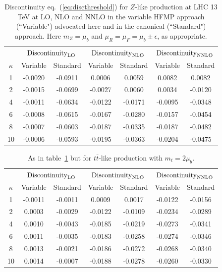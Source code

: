 \documentclass[letter,11pt]{article}
\def\t{{\bar t}}
\def\mub{\mu_b}
\def\k{\kappa}
\begin{document}
%
%
\begin{table}[t]
\centering
\begin{tabular}{c| c c | c c | c c}
& \multicolumn{2}{c}{${\rm Discontinuity}_{\rm LO}$} & \multicolumn{2}{c}{${\rm Discontinuity}_{\rm NLO}$} & \multicolumn{2}{c}{${\rm Discontinuity}_{\rm NNLO}$} \\
$\k$ & Variable & Standard  & Variable & Standard & Variable & Standard \\
\hline
1  & -0.0020 & -0.0911 &  0.0006 &  0.0059 &  0.0082 &  0.0082 \\
2  & -0.0015 & -0.0699 & -0.0027 &  0.0060 &  0.0034 & -0.0120 \\
4  & -0.0011 & -0.0634 & -0.0122 & -0.0171 & -0.0095 & -0.0348 \\
6  & -0.0008 & -0.0615 & -0.0167 & -0.0280 & -0.0157 & -0.0454 \\
8  & -0.0007 & -0.0603 & -0.0187 & -0.0335 & -0.0187 & -0.0482 \\
10 & -0.0006 & -0.0593 & -0.0195 & -0.0363 & -0.0204 & -0.0475 \\
\hline
\end{tabular}
\caption{Discontinuity eq.~(\ref{eq:discthreshold}) for $Z$-like production at LHC 13 TeV at LO, NLO and NNLO in the variable HFMP approach (``Variable") advocated here and in the canonical (``Standard") approach. Here $m_Z=\mub$ and $\mu_R=\mu_F=\mub \pm \epsilon$, as appropriate.}
\label{tab:zdisc}
\end{table}
%
%
\begin{table}[t]
\centering
\begin{tabular}{c| c c | c c | c c}
& \multicolumn{2}{c}{${\rm Discontinuity}_{\rm LO}$} & \multicolumn{2}{c}{${\rm Discontinuity}_{\rm NLO}$} & \multicolumn{2}{c}{${\rm Discontinuity}_{\rm NNLO}$} \\
$\k$ & Variable & Standard  & Variable & Standard & Variable & Standard \\
\hline
1  & -0.0011 & -0.0011 &  0.0009 &  0.0017 & -0.0122 & -0.0156 \\
2  &  0.0003 & -0.0029 & -0.0122 & -0.0109 & -0.0234 & -0.0289 \\
4  &  0.0010 & -0.0043 & -0.0185 & -0.0219 & -0.0273 & -0.0341 \\
6  &  0.0011 & -0.0035 & -0.0183 & -0.0258 & -0.0274 & -0.0346 \\
8  &  0.0013 & -0.0021 & -0.0186 & -0.0272 & -0.0268 & -0.0340 \\
10 &  0.0014 & -0.0007 & -0.0188 & -0.0278 & -0.0260 & -0.0330 \\
\hline
\end{tabular}
\caption{As in table~\ref{tab:zdisc} but for $t\t$-like production with $m_t=2\mub$.}
\label{tab:ttdisc}
\end{table}
%
\end{document}
